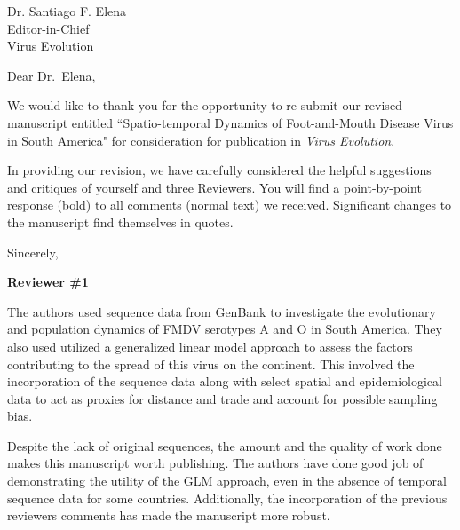 \documentclass[12pt, a4paper]{letter} %
\newenvironment{reply}{$\triangleright$\bf}{$\triangleleft$}
\renewenvironment{quote}
               {\list{}{\rightmargin\leftmargin}%
                \item\relax\normalfont}
               {\endlist}
\begin{document}
 



\begin{letter}{
	Dr. Santiago F. Elena\\
    Editor-in-Chief \\
    Virus Evolution
}


\opening{Dear Dr.~Elena,}

We would like to thank you for the opportunity to re-submit our revised manuscript entitled ``Spatio-temporal Dynamics of Foot-and-Mouth Disease Virus in South America" for consideration for publication in \textit{Virus Evolution}.

In providing our revision, we have carefully considered the helpful suggestions and critiques of yourself and three Reviewers.
You will find a point-by-point response (bold) to all comments (normal text) we received.
Significant changes to the manuscript find themselves in quotes.

\closing{Sincerely,}

\clearpage




\textbf{Reviewer \#1}

The authors used sequence data from GenBank to investigate the evolutionary and population dynamics of FMDV serotypes A and O in South America.
They also used utilized a generalized linear model approach to assess the factors contributing to the spread of this virus on the continent.
This involved the incorporation of  the sequence data along with select spatial and epidemiological data to act as proxies for distance and trade and account for possible sampling bias.

Despite the lack of original sequences, the amount and the quality of work done makes this manuscript worth publishing.
The authors have done good job of demonstrating the utility of the GLM approach, even in the absence of temporal sequence data for some countries.
Additionally, the incorporation of the previous reviewers comments has made the manuscript more robust.


\end{letter}
\end{document}
